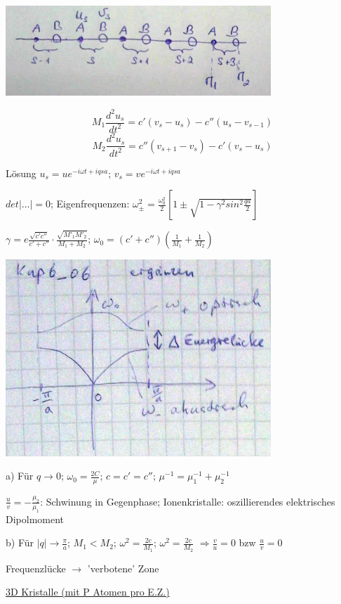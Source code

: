 \includegraphics[width=0.75\textwidth]{kap06_05.png}

\[ M_1\frac{d^2 u_s}{dt^2} = c'(v_s-u_s)-c''(u_s-v_{s-1})\]
\[ M_2\frac{d^2 u_s}{dt^2} = c''(v_{s+1}-v_s)-c'(v_s-u_s)\]

Lösung \(u_s=ue^{-i\omega t + iqsa}\); \(v_s=ve^{-i\omega t + iqsa}\)



\(det|...|=0\); Eigenfrequenzen: \(\omega^2_{\pm} = \frac{\omega^2_0}{2}\left[1\pm \sqrt{1-\gamma^2 sin^2\frac{qa}{2}} \right]\)


\(\gamma = e \frac{\sqrt{c'c''}}{c'+c''}\cdot \frac{\sqrt{M'_1 M'_2}}{M_1+M_2}\); \(\omega_0 = (c'+c'')(\frac{1}{M_1}+\frac{1}{M_2})\)

\includegraphics[width=0.75\textwidth]{kap06_06.png}


a) Für \(q\rightarrow 0\); \(\omega_0=\frac{2C}{\mu}\); \(c=c'=c''\); \(\mu^{-1}=\mu^{-1}_1+\mu^{-1}_2\)

\(\frac{u}{v}= -\frac{\mu_2}{\mu_1}\): Schwinung in Gegenphase; Ionenkristalle: oszillierendes elektrisches Dipolmoment

b) Für \(|q|\rightarrow \frac{\pi}{a}\); \(M_1<M_2\); \(\omega^2=\frac{2c}{M_1}\); \(\omega^2=\frac{2c}{M_2}\) \(\Rightarrow \frac{v}{u}=0\) bzw \(\frac{u}{v}=0\)

Frequenzlücke \(\rightarrow\) 'verbotene' Zone

\underline{3D Kristalle (mit P Atomen pro E.Z.)}

